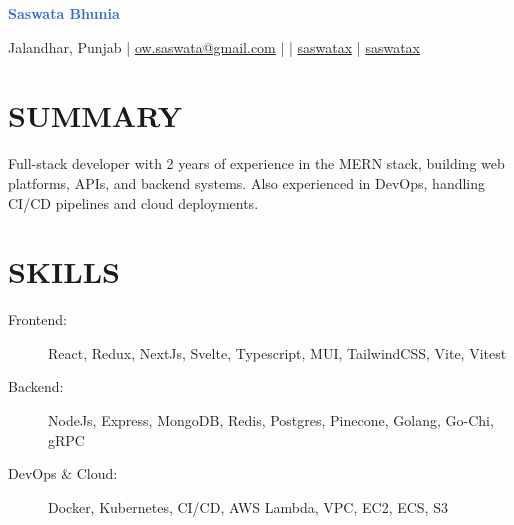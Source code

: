 \documentclass[]{resume}
\begin{document}
\textrm{\Huge\textcolor{highlight}{\textbf{Saswata Bhunia}}}
\vspace{.4em}

Jalandhar, Punjab | \href{mailto:ow.saswata@gmail.com}{\faEnvelope \space ow.saswata@gmail.com} | \faPhone {} | \href{https://www.linkedin.com/in/saswatax}{\faLinkedin \space saswatax} | \href{https://github.com/saswatax}{\faGithub \space saswatax}
\vspace{.4em}

\section{SUMMARY}
Full-stack developer with 2 years of experience in the MERN stack, building web platforms, APIs, and backend systems. Also experienced in DevOps, handling CI/CD pipelines and cloud deployments.

\section{SKILLS}
\begin{description}
  \item[Frontend:] React, Redux, NextJs, Svelte, Typescript, MUI, TailwindCSS, Vite, Vitest
  \item[Backend:] NodeJs, Express, MongoDB, Redis, Postgres, Pinecone, Golang, Go-Chi, gRPC
  \item[DevOps \& Cloud:] Docker, Kubernetes, CI/CD, AWS Lambda, VPC, EC2, ECS, S3
\end{description}
\end{document}
